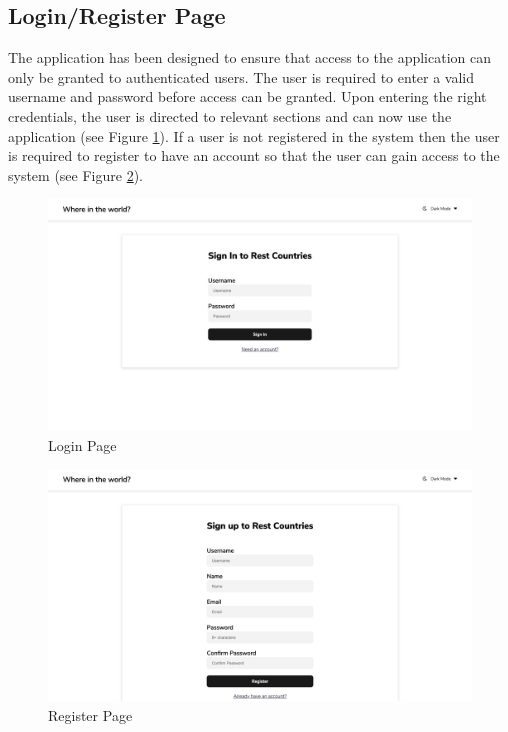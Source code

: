 \documentclass[twoside, a4paper, 12pt]{report}
\begin{document}
\subsection{Login/Register Page}
The application has been designed to ensure that access to the application can only be granted to authenticated users. The user is required to enter a valid username and password before access can be granted. Upon entering the right credentials, the user is directed to relevant sections and can now use the application (see Figure \ref{fig:login_page}). If a user is not registered in the system then the user is required to register to have an account so that the user can gain access to the system (see Figure \ref{fig:register_page}).

\begin{figure} 
	\centering
	\includegraphics[width=1.0\textwidth]{LoginPage.png}
	\caption{Login Page}
	\label{fig:login_page}
\end{figure}

\begin{figure}
	\centering
	\includegraphics[width=1.0\textwidth]{RegisterPage.png}
	\caption{Register Page}
	\label{fig:register_page}
\end{figure}
\end{document}
